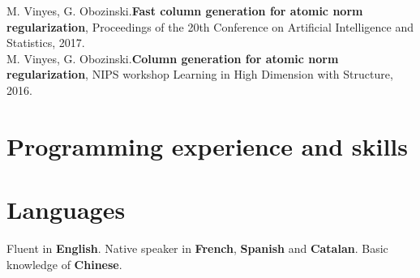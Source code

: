 \documentclass[11pt,a4paper,sans]{moderncv}        %
\begin{document}
M. Vinyes, G. Obozinski.\textbf{Fast column generation for atomic norm regularization}, Proceedings of the 20th Conference on Artificial Intelligence and Statistics, 2017.
\vspace{1em}\\
M. Vinyes, G. Obozinski.\textbf{Column generation for atomic norm regularization}, NIPS workshop Learning in High Dimension with Structure, 2016.

\section{Programming experience and skills}

\section{Languages}
Fluent in \textbf{English}. Native speaker in \textbf{French}, \textbf{Spanish} and \textbf{Catalan}.  Basic knowledge of \textbf{Chinese}.







\nocite{*}

\end{document}
